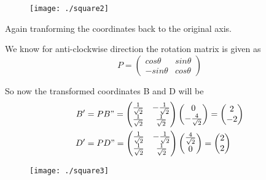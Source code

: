 \documentclass[12pt]{article}
\begin{document}
\begin{figure}[!h]
	\begin{center} 
	    \texttt{[image: ./square2]}
	\end{center}
\caption{}
\label{fig:Fig1}
\end{figure}

Again tranforming the coordinates back to the original axis.

We know for anti-clockwise direction the rotation matrix is given as
$$P =
\begin{pmatrix}
cos\theta & sin\theta \\
-sin\theta & cos\theta
\end{pmatrix}
$$

So now the transformed coordinates B and D will be
\begin{align*}
B' &= PB" = \begin{pmatrix}
\frac{1}{\sqrt{2}} & -\frac{1}{\sqrt{2}} \\
\frac{1}{\sqrt{2}} & \frac{1}{\sqrt{2}}
\end{pmatrix}
\begin{pmatrix}
 0\\
 -\frac{4}{\sqrt{2}}
\end{pmatrix} = 
\begin{pmatrix}
2 \\
-2
\end{pmatrix}\\
D' &= PD" = \begin{pmatrix}
\frac{1}{\sqrt{2}} & -\frac{1}{\sqrt{2}} \\
\frac{1}{\sqrt{2}} & \frac{1}{\sqrt{2}}
\end{pmatrix}
\begin{pmatrix}
 \frac{4}{\sqrt{2}}\\
 0
\end{pmatrix} = 
\begin{pmatrix}
2 \\
2
\end{pmatrix}\\
\end{align*}

\begin{figure}[!h]
	\begin{center} 
	    \texttt{[image: ./square3]}
	\end{center}
\caption{}
\label{fig:Fig1}
\end{figure}
\end{document}
